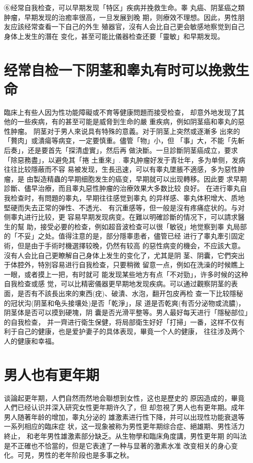 \documentclass[12pt,UTF8]{ctexbook}
\begin{document}
⑥经常自我检查，可以早期发现「特区」疾病并挽救生命。睾
丸癌、阴茎癌之類肿瘤，早期发现的治癒率很高，一旦发展到晚
期，则療效不理想。因此，男性朋友应該经常查看一下自己的外生
殖器官，沒有人会比自己更会敏感地察觉到自己身体上发生的潛在
变化，甚至可能比儀器检查还要「靈敏」和早期发现。

\section{经常自检一下阴茎和睾丸有时可以挽救生命}

臨床上有些人因为性功能障礙或不育等健康問題而接受检查，
却意外地发现了其他的一些疾病，有的甚至可能是威脅到生命的嚴
重疾病，例如阴茎癌和睾丸的惡性肿瘤。
阴茎对于男人來说具有特殊的意義。对于阴茎上突然或逐漸多
出來的「贅肉」或潰瘍等病变，一定要慎重。儘管「物」小，但
「事」大，不能「先斬后奏」，还是要首先「探清虚實」，然后再
做決斷。一旦診斷阴茎癌成立，要求「除惡務盡」，以避免其「捲
土重來」.
睾丸肿瘤好发于青壮年，多为单侧，发病往往比较隱蔽而不容
易被发现，生長迅速，可以有睾丸墜脹不適感，多为惡性肿瘤，是
由製造精蟲的早期细胞发生的癌变，早期就可以出现轉移。因此要
求早期診斷、儘早治療，而且睾丸惡性肿瘤的治療效果大多数比较
良好。
在进行睾丸自我检查时，有問題的睾丸，早期往往感觉到睾丸
的异样感、睾丸体积增大、质地堅硬而失去正常的弹性、不透光、
有沉重感等，但一般是沒有疼痛症状的。与对侧睾丸进行比较，更
容易早期发现病变。在難以明確診斷的情况下，可以請求醫生的幫
助，接受必要的检查，例如超音波检查可以很「敏锐」地觉察到睾
丸局部的「不妥」之处。值得注意的是，部分隱睾患者，儘管已经
进行了睾丸牽引固定術，但是由于手術时機選擇较晚，仍然有较高
的惡性病变的機会，不应該大意。
沒有人会比自己更瞭解自己身体上发生的变化了，尤其是阴
茎、阴囊，它們突出于体腔外，特別容易进行自我检查，只要稍微
留意一点，例如在洗澡的时候瞧上一眼，或者摸上一把，有时就可
能发现某些地方有点「不对勁」，许多时候的这种自我检查或感
觉，可以比精密儀器更早期地发现疾病。可以通过觀察阴茎的表
面，是否有不該長出來的東西(疣)、破潰、水泡，翻开包皮再检
查一下比较隱秘的冠状沟(阴茎和龟头接壤处)是否「乾淨」，尿
道是否乾爽(有否分泌物或流膿)，阴茎体是否可以摸到硬塊，阴
囊是否光滑平整等。男人最好每天进行「隱秘部位」的自我检查，
并一齊进行衛生保健，将局部衛生好好「打掃」一番，这样不仅有
利于自己的健康，也是爱护妻子的具体表现，畢竟一个人的健康，
往往涉及两个人的健康和幸福。

\section{男人也有更年期}

谈論起更年期，人們自然而然地会聯想到女性，这也是歷史的
原因造成的，畢竟人們已经认识并深入研究女性更年期许久了，但
却忽視了男人也有更年期。成年男人随著年龄的增加，睾丸分泌的
雄激素进行性下降，并可以出现性功能衰退等一系列相应的臨床症
状，这一现象被称为男性更年期综合症、絕雄期、男性活力終止，
和老年男性雄激素部分缺乏。从生物學和臨床角度講，男性更年期
的叫法是不正確也不恰當的，但是它表達了一种与显著的激素水准
改变相关的身心变化。可見，男性的老年阶段也是多事之秋。
\end{document}
